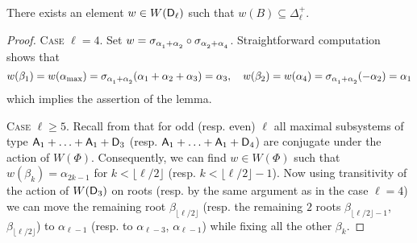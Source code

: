 \begin{lemma}\label{lemma:nikolov-weyl} There exists an element $w\in W(\mathsf{D}_\ell)$ such that $w(B) \subseteq \Delta_\ell^+$. \end{lemma}
\begin{proof}
\textsc{Case $\ell=4$.} Set $w = \sigma_{\alpha\ssub{1} + \alpha\ssub{2}} \circ \sigma_{\alpha\ssub{2} + \alpha\ssub{4}}$.
Straightforward computation shows that 
$$w(\beta_1) = w(\alpha_\mathrm{max}) = \sigma_{\alpha\ssub{1} + \alpha\ssub{2}}(\alpha_1 + \alpha_2 + \alpha_3) = \alpha_3,\quad w(\beta_2) = w(\alpha_4) = \sigma_{\alpha\ssub{1} + \alpha\ssub{2}}(- \alpha_2) = \alpha_1 $$
which implies the assertion of the lemma.

\textsc{Case $\ell \geq 5$.}
Recall from \cite[Table~9]{Dy72} that for odd (resp. even) $\ell$ all maximal subsystems of type $\mathsf{A}_1+\ldots+\mathsf{A}_1+\mathsf{D}_3$
(resp. $\mathsf{A}_1+\ldots+\mathsf{A}_1+\mathsf{D}_4$) are conjugate under the action of $W(\Phi)$. Consequently, we can find $w\in W(\Phi)$
such that $w(\beta_k) = \alpha_{2k-1}$ for $k < \lfloor\ell/2\rfloor$ (resp. $k < \lfloor\ell/2\rfloor-1$). 
Now using transitivity of the action of $W(\mathsf{D}_3)$ on roots (resp. by the same argument as in the case $\ell=4$) we can move the remaining root $\beta_{\lfloor\ell/2\rfloor}$ 
(resp. the remaining $2$ roots $\beta_{\lfloor\ell/2\rfloor-1}$, $\beta_{\lfloor\ell/2\rfloor}$) to
$\alpha_{\ell-1}$ (resp. to $\alpha_{\ell-3}$, $\alpha_{\ell-1}$) while fixing all the other $\beta_k$. \end{proof}

